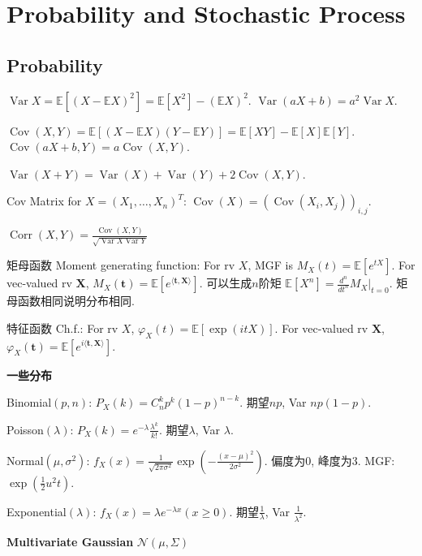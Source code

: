 \documentclass[UTF8]{ctexart}
\begin{document}
\section{Probability and Stochastic Process}

\subsection{Probability}

$\operatorname{Var}X = \mathbb{E}[(X-\mathbb{E}X)^2] = \mathbb{E}[X^2]-(\mathbb{E}X)^2$.
$\operatorname{Var}(aX+b) = a^2 \operatorname{Var}X$.

$\operatorname{Cov}(X,Y) = \mathbb{E}[(X-\mathbb{E}X)(Y-\mathbb{E}Y)]
	= \mathbb{E}[XY]-\mathbb{E}[X]\mathbb{E}[Y]$.
$\operatorname{Cov}(aX+b,Y) = a\operatorname{Cov}(X,Y)$.

$\operatorname{Var}(X+Y)=\operatorname{Var}(X)+\operatorname{Var}(Y)+2\operatorname{Cov}(X,Y)$.

Cov Matrix for $X=(X_1,\dots,X_n)^T$: $\operatorname{Cov}(X) = (\operatorname{Cov}(X_i,X_j))_{i,j}$.

$\operatorname{Corr}(X,Y)=\frac{\operatorname{Cov}(X,Y)}{\sqrt{\operatorname{Var}X \operatorname{Var}Y}}$

矩母函数 Moment generating function: For rv $X$, MGF is $M_X(t)=\mathbb{E}[e^{tX}]$.
For vec-valued rv $\mathbf{X}$, $M_X(\mathbf{t})=\mathbb{E}[e^{\langle \mathbf{t},\mathbf{X} \rangle }]$.
可以生成$n$阶矩 $\mathbb{E}[X^n]=\frac{d^n}{dt^n}M_X \Big| _{t=0}$. 矩母函数相同说明分布相同.

特征函数 Ch.f.: For rv $X$, $\varphi_X(t)=\mathbb{E} [\exp(itX)]$.
For vec-valued rv $\mathbf{X}$, $\varphi_X(\mathbf{t})=\mathbb{E}[e^{i \langle \mathbf{t},\mathbf{X} \rangle }]$.

\noindent \textbf{一些分布} \par 
Binomial$(p, n)$: $P_X(k)=C_n^k p^k (1-p)^{n-k}$. 期望$np$, Var $np(1-p)$. \par 
Poisson$(\lambda)$: $P_X(k)=e^{-\lambda}\frac{\lambda^k}{k!}$. 期望$\lambda$, Var $\lambda$.\par 
Normal$(\mu, \sigma^2)$: $f_X(x)=\frac{1}{\sqrt{2\pi\sigma^2}}\exp(-\frac{(x-\mu)^2}{2\sigma^2})$. 
偏度为0, 峰度为3. MGF: $\exp (\frac12 u^2 t)$.\par 
Exponential$(\lambda)$: $f_X(x) = \lambda e^{-\lambda x}(x\geq 0)$. 期望$\frac{1}{\lambda}$, Var $\frac{1}{\lambda^2}$.


\noindent \textbf{Multivariate Gaussian} $\mathcal{N}(\mu,\Sigma)$
\end{document}
